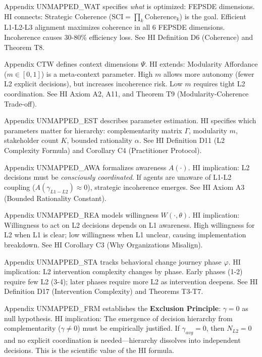 \begin{tcolorbox}[colback=white, colframe=black,
    title=\textbf{10C Integration: How HI CORE-HIERARCHY Connects to Other COREs}]
\begin{description}[style=nextline, labelindent=0pt, leftmargin=1.5cm]
\item[\textbf{C (CORE-WHAT)}]
Appendix UNMAPPED_WAT specifies \textit{what} is optimized: FEPSDE dimensions. HI connects: Strategic Coherence ($\text{SCI} = \prod_k \text{Coherence}_k$) is the goal. Efficient L1-L2-L3 alignment maximizes coherence in all 6 FEPSDE dimensions. Incoherence causes 30-80\% efficiency loss. See HI Definition D6 (Coherence) and Theorem T8.

\item[\textbf{V (CORE-WHEN)}]
Appendix CTW defines context dimensions $\Psi$. HI extends: Modularity Affordance ($m \in [0,1]$) is a meta-context parameter. High $m$ allows more autonomy (fewer L2 explicit decisions), but increases incoherence risk. Low $m$ requires tight L2 coordination. See HI Axiom A2, A11, and Theorem T9 (Modularity-Coherence Trade-off).

\item[\textbf{BBB (CORE-WHERE)}]
Appendix UNMAPPED_EST describes parameter estimation. HI specifies which parameters matter for hierarchy: complementarity matrix $\Gamma$, modularity $m$, stakeholder count $K$, bounded rationality $\alpha$. See HI Definition D11 (L2 Complexity Formula) and Corollary C4 (Practitioner Protocol).

\item[\textbf{AU (CORE-AWARE)}]
Appendix UNMAPPED_AWA formalizes awareness $A(\cdot)$. HI implication: L2 decisions must be \textit{consciously coordinated}. If agents are unaware of L1-L2 coupling ($A(\gamma_{L1-L2}) \approx 0$), strategic incoherence emerges. See HI Axiom A3 (Bounded Rationality Constant).

\item[\textbf{AV (CORE-READY)}]
Appendix UNMAPPED_REA models willingness $W(\cdot, \theta)$. HI implication: Willingness to act on L2 decisions depends on L1 awareness. High willingness for L2 when L1 is clear; low willingness when L1 unclear, causing implementation breakdown. See HI Corollary C3 (Why Organizations Misalign).

\item[\textbf{AW (CORE-STAGE)}]
Appendix UNMAPPED_STA tracks behavioral change journey phase $\varphi$. HI implication: L2 intervention complexity changes by phase. Early phases (1-2) require few L2 (3-4); later phases require more L2 as intervention deepens. See HI Definition D17 (Intervention Complexity) and Theorems T3-T7.

\item[\textbf{XVIII (LIT-FEHR-METHOD)}]
Appendix UNMAPPED_FRM establishes the \textbf{Exclusion Principle}: $\gamma = 0$ as null hypothesis. HI implication: The emergence of decision hierarchy from complementarity ($\gamma \neq 0$) must be empirically justified. If $\gamma_{avg} = 0$, then $N_{L2} = 0$ and no explicit coordination is needed---hierarchy dissolves into independent decisions. This is the scientific value of the HI formula.


\end{description}
\end{tcolorbox}
